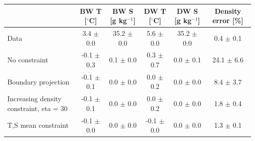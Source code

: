 % 
\begin{tabular}{lccccc}
\toprule
 & BW T [$^\circ$C] & BW S [g kg$^{-1}$] & DW T [$^\circ$C] & DW S [g kg$^{-1}$] & Density error [\%] \\
\midrule
Data & 3.4 $\pm$ 0.0 & 35.2 $\pm$ 0.0 & 5.6 $\pm$ 0.0 & 35.2 $\pm$ 0.0 & 0.4 $\pm$ 0.1 \\
No constraint & -0.1 $\pm$ 0.3 & 0.1 $\pm$ 0.0 & 0.3 $\pm$ 0.7 & 0.0 $\pm$ 0.1 & 24.1 $\pm$ 6.6 \\
Boundary projection & -0.1 $\pm$ 0.1 & 0.0 $\pm$ 0.0 & 0.0 $\pm$ 0.2 & 0.0 $\pm$ 0.0 & 8.4 $\pm$ 3.7 \\
Increasing density constraint, eta = 30 & -0.1 $\pm$ 0.1 & 0.0 $\pm$ 0.0 & 0.0 $\pm$ 0.2 & 0.0 $\pm$ 0.0 & 1.8 $\pm$ 0.4 \\
T,S mean constraint & -0.1 $\pm$ 0.0 & 0.0 $\pm$ 0.0 & -0.1 $\pm$ 0.0 & 0.0 $\pm$ 0.0 & 1.3 $\pm$ 0.1 \\
\bottomrule
\end{tabular}
